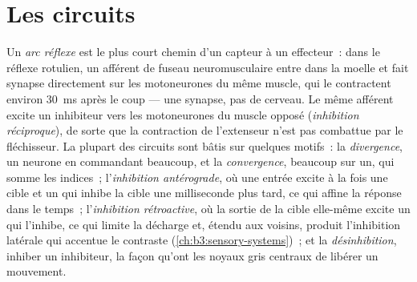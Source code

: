 \section{Les circuits}

\begin{definition}\label{def:b3:nervous-systems:circuits}
Un \emph{arc réflexe} est le plus court chemin d'un capteur à un
effecteur~: dans le réflexe rotulien, un afférent de fuseau
neuromusculaire entre dans la moelle et fait synapse directement sur les
motoneurones du même muscle, qui le contractent environ \qty{30}{ms}
après le coup --- une synapse, pas de cerveau. Le même afférent excite
un  inhibiteur vers les motoneurones du muscle opposé
(\emph{inhibition réciproque}), de sorte que la contraction de
l'extenseur n'est pas combattue par le fléchisseur. La plupart des
circuits sont bâtis sur quelques motifs~: la \emph{divergence}, un
neurone en commandant beaucoup, et la \emph{convergence}, beaucoup sur
un, qui somme les indices~; l'\emph{inhibition antérograde}, où une
entrée excite à la fois une cible et un  qui inhibe la cible
une milliseconde plus tard, ce qui affine la réponse dans le temps~;
l'\emph{inhibition rétroactive}, où la sortie de la cible elle-même
excite un  qui l'inhibe, ce qui limite la décharge et,
étendu aux voisins, produit l'inhibition latérale qui accentue le
contraste (\cref{ch:b3:sensory-systems})~; et la \emph{désinhibition},
inhiber un inhibiteur, la façon qu'ont les noyaux gris centraux de
libérer un mouvement.
\end{definition}

